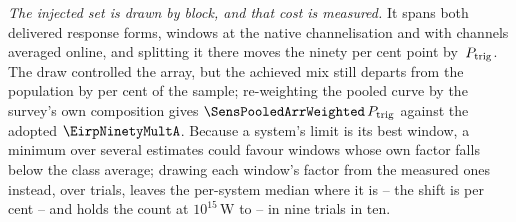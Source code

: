 \emph{The injected set is drawn by block, and that cost is measured.}
It spans both delivered response forms, \TfInjNat{} windows at the native
channelisation and \TfInjAvg{} with channels averaged online, and splitting it
there moves the ninety per cent point by \TfFacShift\,$P_{\rm trig}$. The
draw controlled the array, but the achieved mix still departs from the
population by \SensCovWorstPct{} per cent of the sample; re-weighting the
pooled curve by the survey's own composition gives
$\SensPooledArrWeighted\,P_{\rm trig}$ against the adopted
$\EirpNinetyMultA$. Because a system's limit is its best window, a minimum
over several estimates could favour windows whose own factor falls below the
class average; drawing each window's factor from the \SensNInj{} measured
ones instead, over \ScRsNTrial{} trials, leaves the per-system median where
it is -- the shift is \ScRsMedShiftPct{} per cent -- and holds the count at
$10^{15}$\,W to \ScRsNLo--\ScRsNHi{} in nine trials in ten.
